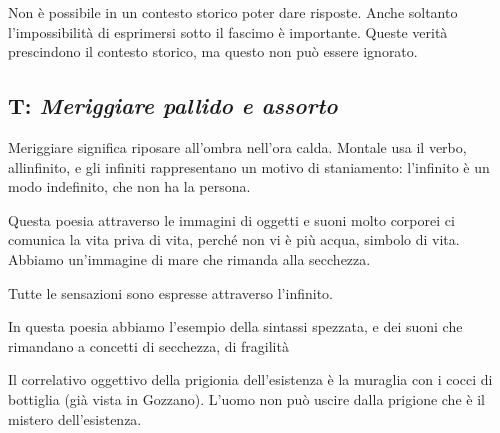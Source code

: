 Non è possibile in un contesto storico poter dare risposte. Anche soltanto l'impossibilità di esprimersi sotto il fascimo è importante. Queste verità prescindono il contesto storico, ma questo non può essere ignorato.

\subsection{T: \textit{Meriggiare pallido e assorto}}

Meriggiare significa riposare all'ombra nell'ora calda. Montale usa il verbo, allinfinito, e gli infiniti rappresentano un motivo di staniamento: l'infinito è un modo indefinito, che non ha la persona.

Questa poesia attraverso le immagini di oggetti e suoni molto corporei ci comunica la vita priva di vita, perché non vi è più acqua, simbolo di vita. Abbiamo un'immagine di mare che rimanda alla secchezza.


Tutte le sensazioni sono espresse attraverso l'infinito.


In questa poesia abbiamo l'esempio della sintassi spezzata, e dei suoni che rimandano a concetti di secchezza, di fragilità


Il correlativo oggettivo della prigionia dell'esistenza è la muraglia con i cocci di bottiglia (già vista in Gozzano). L'uomo non può uscire dalla prigione che è il mistero dell'esistenza.

